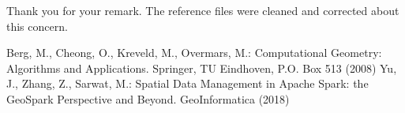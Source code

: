 \documentclass[10pt]{article}
\begin{document}
Thank you for your remark.  The reference files were cleaned and corrected about this concern.

%
%

\begin{thebibliography}{9}

Berg, M., Cheong, O., Kreveld, M., Overmars, M.: Computational Geometry: Algorithms and Applications. Springer, TU Eindhoven, P.O. Box 513 (2008)
Yu, J., Zhang, Z., Sarwat, M.: Spatial Data Management in Apache Spark: the GeoSpark Perspective and Beyond. GeoInformatica (2018)

\end{thebibliography}
\end{document}
